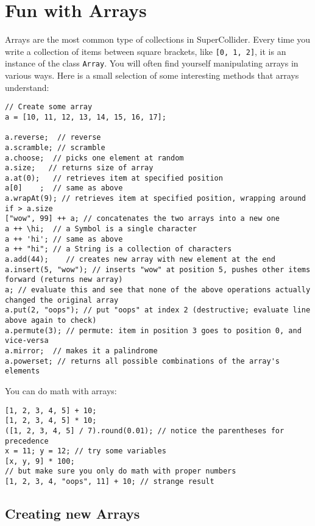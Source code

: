 \section{Fun with Arrays}
\label{sec:arrays}

Arrays are the most common type of collections in SuperCollider. Every time you write a collection of items between square brackets, like \texttt{[0, 1, 2]}, it is an instance of the class \texttt{Array}. You will often find yourself manipulating arrays in various ways. Here is a small selection of some interesting methods that arrays understand:

 
\begin{lstlisting}[style=SuperCollider-IDE, basicstyle=\scttfamily\footnotesize]
// Create some array
a = [10, 11, 12, 13, 14, 15, 16, 17];

a.reverse;  // reverse
a.scramble; // scramble
a.choose;  // picks one element at random
a.size;	  // returns size of array
a.at(0);   // retrieves item at specified position
a[0]	;  // same as above
a.wrapAt(9); // retrieves item at specified position, wrapping around if > a.size
["wow", 99] ++ a; // concatenates the two arrays into a new one
a ++ \hi;  // a Symbol is a single character
a ++ 'hi'; // same as above
a ++ "hi"; // a String is a collection of characters
a.add(44);    // creates new array with new element at the end 
a.insert(5, "wow"); // inserts "wow" at position 5, pushes other items forward (returns new array)
a; // evaluate this and see that none of the above operations actually changed the original array
a.put(2, "oops"); // put "oops" at index 2 (destructive; evaluate line above again to check)
a.permute(3); // permute: item in position 3 goes to position 0, and vice-versa 
a.mirror;  // makes it a palindrome
a.powerset; // returns all possible combinations of the array's elements
\end{lstlisting}
 

You can do math with arrays:

 
\begin{lstlisting}[style=SuperCollider-IDE, basicstyle=\scttfamily\footnotesize]
[1, 2, 3, 4, 5] + 10;
[1, 2, 3, 4, 5] * 10;
([1, 2, 3, 4, 5] / 7).round(0.01); // notice the parentheses for precedence
x = 11; y = 12; // try some variables
[x, y, 9] * 100;
// but make sure you only do math with proper numbers
[1, 2, 3, 4, "oops", 11] + 10; // strange result
\end{lstlisting}
 

\subsection{Creating new Arrays}

